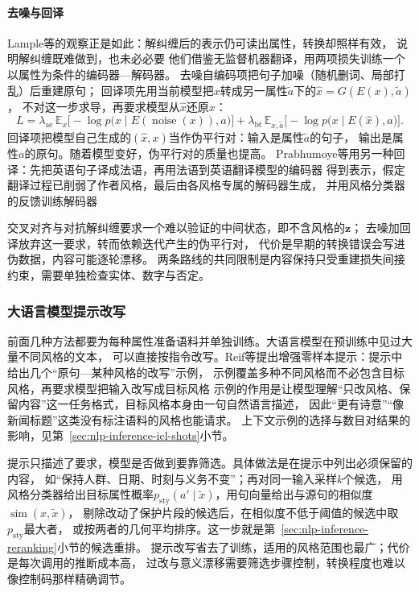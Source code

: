 \paragraph{去噪与回译}
Lample等的观察正是如此：解纠缠后的表示仍可读出属性，转换却照样有效，
说明解纠缠既难做到，也未必必要
他们借鉴无监督机器翻译，用两项损失训练一个以属性为条件的编码器—解码器。
去噪自编码项把句子加噪（随机删词、局部打乱）后重建原句；
回译项先用当前模型把$x$转成另一属性$\tilde a$下的$\hat x=G(E(x),\tilde a)$，
不对这一步求导，再要求模型从$\hat x$还原$x$：
\begin{equation}
  L=\lambda_{\mathrm{ae}}\,\mathbb{E}_{x}
    \bigl[-\log p\bigl(x\mid E(\operatorname{noise}(x)),a\bigr)\bigr]
   +\lambda_{\mathrm{bt}}\,\mathbb{E}_{x,\tilde a}
    \bigl[-\log p\bigl(x\mid E(\hat x),a\bigr)\bigr].
  \label{eq:nlp-generation-lample-bt}
\end{equation}
回译项把模型自己生成的$(\hat x,x)$当作伪平行对：输入是属性$\tilde a$的句子，
输出是属性$a$的原句。随着模型变好，伪平行对的质量也提高。
Prabhumoye等用另一种回译：先把英语句子译成法语，再用法语到英语翻译模型的编码器
得到表示，假定翻译过程已削弱了作者风格，最后由各风格专属的解码器生成，
并用风格分类器的反馈训练解码器

交叉对齐与对抗解纠缠要求一个难以验证的中间状态，即不含风格的$\bm z$；
去噪加回译放弃这一要求，转而依赖迭代产生的伪平行对，
代价是早期的转换错误会写进伪数据，内容可能逐轮漂移。
两条路线的共同限制是内容保持只受重建损失间接约束，需要单独检查实体、数字与否定。

\subsubsection{大语言模型提示改写}
\label{sec:nlp-generation-llm-style}

前面几种方法都要为每种属性准备语料并单独训练。大语言模型在预训练中见过大量不同风格的文本，
可以直接按指令改写。Reif等提出增强零样本提示：提示中给出几个“原句—某种风格的改写”示例，
示例覆盖多种不同风格而不必包含目标风格，再要求模型把输入改写成目标风格
示例的作用是让模型理解“只改风格、保留内容”这一任务格式，目标风格本身由一句自然语言描述，
因此“更有诗意”“像新闻标题”这类没有标注语料的风格也能请求。
上下文示例的选择与数目对结果的影响，见第~\ref{sec:nlp-inference-icl-shots}小节。

提示只描述了要求，模型是否做到要靠筛选。具体做法是在提示中列出必须保留的内容，
如“保持人群、日期、时刻与义务不变”；再对同一输入采样$k$个候选，
用风格分类器给出目标属性概率$p_{\mathrm{sty}}(a'\mid\tilde x)$，用句向量给出与源句的相似度$\operatorname{sim}(x,\tilde x)$，
剔除改动了保护片段的候选后，在相似度不低于阈值的候选中取$p_{\mathrm{sty}}$最大者，
或按两者的几何平均排序。这一步就是第~\ref{sec:nlp-inference-reranking}小节的候选重排。
提示改写省去了训练，适用的风格范围也最广；代价是每次调用的推断成本高，
过改与意义漂移需要筛选步骤控制，转换程度也难以像控制码那样精确调节。

